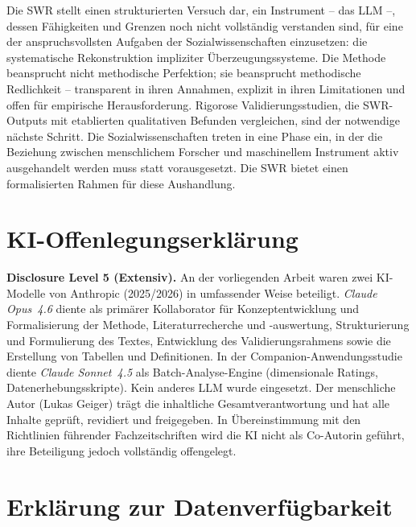 \documentclass[11pt,a4paper]{article}
\theoremstyle{definition}
\theoremstyle{plain}
\theoremstyle{remark}
\begin{document}
Die SWR stellt einen strukturierten Versuch dar, ein Instrument -- das LLM --, dessen F\"ahigkeiten und Grenzen noch nicht vollst\"andig verstanden sind, f\"ur eine der anspruchsvollsten Aufgaben der Sozialwissenschaften einzusetzen: die systematische Rekonstruktion impliziter \"Uberzeugungssysteme. Die Methode beansprucht nicht methodische Perfektion; sie beansprucht methodische Redlichkeit -- transparent in ihren Annahmen, explizit in ihren Limitationen und offen f\"ur empirische Herausforderung. Rigorose Validierungsstudien, die SWR-Outputs mit etablierten qualitativen Befunden vergleichen, sind der notwendige n\"achste Schritt. Die Sozialwissenschaften treten in eine Phase ein, in der die Beziehung zwischen menschlichem Forscher und maschinellem Instrument aktiv ausgehandelt werden muss statt vorausgesetzt. Die SWR bietet einen formalisierten Rahmen f\"ur diese Aushandlung.



\section*{KI-Offenlegungserkl\"arung}

\noindent\textbf{Disclosure Level 5 (Extensiv).} An der vorliegenden Arbeit waren zwei KI-Modelle von Anthropic (2025/2026) in umfassender Weise beteiligt. \emph{Claude Opus~4.6} diente als prim\"arer Kollaborator f\"ur Konzeptentwicklung und Formalisierung der Methode, Literaturrecherche und -auswertung, Strukturierung und Formulierung des Textes, Entwicklung des Validierungsrahmens sowie die Erstellung von Tabellen und Definitionen. In der Companion-Anwendungsstudie \citep{Geiger2026Elite} diente \emph{Claude Sonnet~4.5} als Batch-Analyse-Engine (dimensionale Ratings, Datenerhebungsskripte). Kein anderes LLM wurde eingesetzt. Der menschliche Autor (Lukas Geiger) tr\"agt die inhaltliche Gesamtverantwortung und hat alle Inhalte gepr\"uft, revidiert und freigegeben. In \"Ubereinstimmung mit den Richtlinien f\"uhrender Fachzeitschriften wird die KI nicht als Co-Autorin gef\"uhrt, ihre Beteiligung jedoch vollst\"andig offengelegt.



\section*{Erkl\"arung zur Datenverf\"ugbarkeit}
\end{document}

